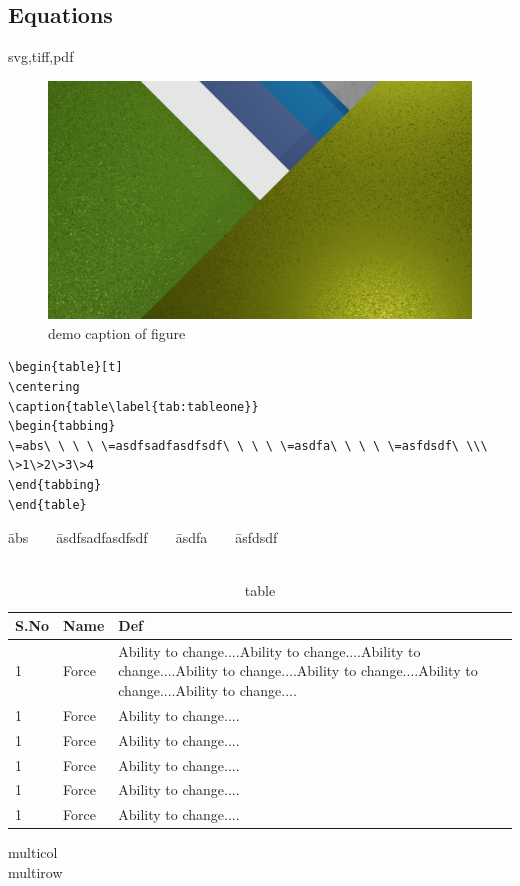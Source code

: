 \Blindtext


\subsection{Equations}
svg,tiff,pdf

\begin{figure}[htb]%
\centering
\includegraphics[width=\linewidth]{./01.png}


\caption{demo caption of figure\label{fig:fig1}}
\end{figure}

\begin{verbatim}
\begin{table}[t]
\centering
\caption{table\label{tab:tableone}}
\begin{tabbing}
\=abs\ \ \ \ \=asdfsadfasdfsdf\ \ \ \ \=asdfa\ \ \ \ \=asfdsdf\ \\\
\>1\>2\>3\>4
\end{tabbing}
\end{table}
\end{verbatim}

\begin{table}[t]
\centering
\caption{table\label{tab:tableone}}
\begin{tabbing}
\=abs\ \ \ \ \=asdfsadfasdfsdf\ \ \ \ \=asdfa\ \ \ \ \=asfdsdf\ \\\
\end{tabbing}
\end{table}





\begin{table}[t]
\centering
\caption{table\label{tab:tableone}}
\begin{tabular}{|p{.2\linewidth}|p{.2\linewidth}|p{.4\linewidth}|}
\hline
S.No&Name&Def\\
\hline
1&Force&Ability to change....Ability to change....Ability to change....Ability to change....Ability to change....Ability to change....Ability to change....\\
1&Force&Ability to change....\\
1&Force&Ability to change....\\
1&Force&Ability to change....\\
1&Force&Ability to change....\\
1&Force&Ability to change....\\
\hline
\end{tabular}
\end{table}

multicol\\multirow


